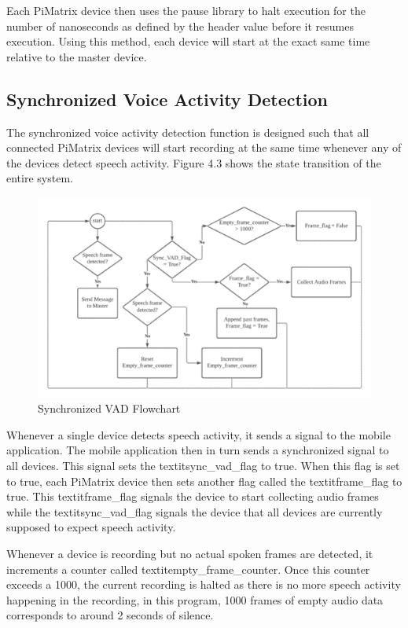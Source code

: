 \documentclass[hidelinks,12pt]{report} %
\begin{document}
Each PiMatrix device then uses the pause library to halt execution for the number of nanoseconds as defined by the header value before it resumes execution. Using this method, each device will start at the exact same time relative to the master device.

\subsection{Synchronized Voice Activity Detection}

The synchronized voice activity detection function is designed such that all connected PiMatrix devices will start recording at the same time whenever any of the devices detect speech activity. Figure 4.3 shows the state transition of the entire system.

\begin{figure}[h]
\centering
\includegraphics[scale = 1.0]{fig4.3} 
\caption{Synchronized VAD Flowchart}
\label{fig}
\end{figure}

Whenever a single device detects speech activity, it sends a signal to the mobile application. The mobile application then in turn sends a synchronized signal to all devices. This signal sets the textit{sync\_vad\_flag} to true. When this flag is set to true, each PiMatrix device then sets another flag called the textit{frame\_flag} to true. This textit{frame\_flag} signals the device to start collecting audio frames while the textit{sync\_vad\_flag} signals the device that all devices are currently supposed to expect speech activity. 

Whenever a device is recording but no actual spoken frames are detected, it increments a counter called textit{empty\_frame\_counter}. Once this counter exceeds a 1000, the current recording is halted as there is no more speech activity happening in the recording, in this program, 1000 frames of empty audio data corresponds to around 2 seconds of silence. 
\end{document}

